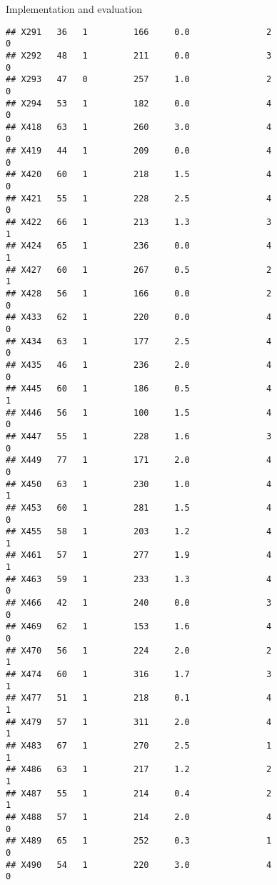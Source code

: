 \documentclass[
  ignorenonframetext,
]{beamer}
\begin{document}
\begin{frame}[fragile]{Implementation and evaluation}
\begin{verbatim}
## X291   36   1         166     0.0               2                   0
## X292   48   1         211     0.0               3                   0
## X293   47   0         257     1.0               2                   0
## X294   53   1         182     0.0               4                   0
## X418   63   1         260     3.0               4                   0
## X419   44   1         209     0.0               4                   0
## X420   60   1         218     1.5               4                   0
## X421   55   1         228     2.5               4                   0
## X422   66   1         213     1.3               3                   1
## X424   65   1         236     0.0               4                   1
## X427   60   1         267     0.5               2                   1
## X428   56   1         166     0.0               2                   0
## X433   62   1         220     0.0               4                   0
## X434   63   1         177     2.5               4                   0
## X435   46   1         236     2.0               4                   0
## X445   60   1         186     0.5               4                   1
## X446   56   1         100     1.5               4                   0
## X447   55   1         228     1.6               3                   0
## X449   77   1         171     2.0               4                   0
## X450   63   1         230     1.0               4                   1
## X453   60   1         281     1.5               4                   0
## X455   58   1         203     1.2               4                   1
## X461   57   1         277     1.9               4                   1
## X463   59   1         233     1.3               4                   0
## X466   42   1         240     0.0               3                   0
## X469   62   1         153     1.6               4                   0
## X470   56   1         224     2.0               2                   1
## X474   60   1         316     1.7               3                   1
## X477   51   1         218     0.1               4                   1
## X479   57   1         311     2.0               4                   1
## X483   67   1         270     2.5               1                   1
## X486   63   1         217     1.2               2                   1
## X487   55   1         214     0.4               2                   1
## X488   57   1         214     2.0               4                   0
## X489   65   1         252     0.3               1                   0
## X490   54   1         220     3.0               4                   0

\end{verbatim}
\end{frame}
\end{document}
